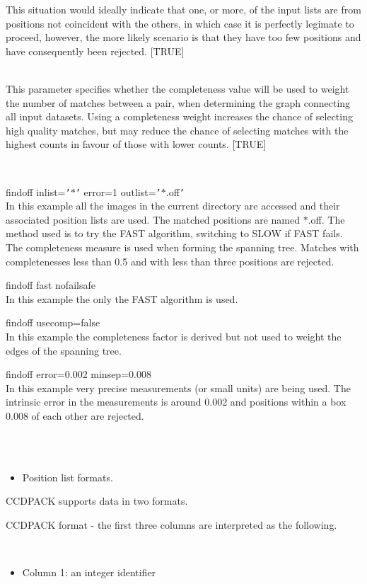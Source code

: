 \documentclass[twoside,11pt]{article}
\renewcommand{\_}{\texttt{\symbol{95}}}
\newcommand{\qs}[1]{{\tt '}#1{\tt '}}
\newcommand{\sstexamples}[1]{
   \item[Examples:] \mbox{} \\
   \vspace{-3.5ex}
   \begin{description}
      #1
   \end{description}
}
\newcommand{\sstsubsection}[1]{ \item[{#1}] \mbox{} \\}
\newcommand{\sstexamplesubsection}[2]{\sloppy \item{\ssttt #1} \mbox{} \\ #2 }
\newcommand{\sstnotes}[1]{\item[Notes:] \mbox{} \\[1.3ex] #1}
\newcommand{\sstitemlist}[1]{
  \mbox{} \\
  \vspace{-3.5ex}
  \begin{itemize}
     #1
  \end{itemize}
}
\newcommand{\sstitem}{\item}
\newcommand{\sstexamples}[1]{
      \item[Examples:] \\
      \begin{description}
         #1
      \end{description}
      \\
   }
\newcommand{\sstsubsection}[1]{\item[{#1}]}
\newcommand{\sstexamplesubsection}[2]{\item[{\ssttt #1}] #2}
\newcommand{\sstnotes}[1]{\item[Notes:] #1 }
\newcommand{\sstitemlist}[1]{
      \begin{itemize}
         #1
      \end{itemize}
      \\
   }
\newcommand{\sstitem}{\item}
\begin{document}
{{{        This situation would ideally indicate that one, or more, of the
        input lists are from positions not coincident with the others, in
        which case it is perfectly legimate to proceed, however, the more
        likely scenario is that they have too few positions and have
        consequently been rejected.
        [TRUE]
     }
      \sstsubsection{
         USECOMP = LOGICAL (Read)
      } {
         This parameter specifies whether the completeness value will
         be used to weight the number of matches between a pair, when
         determining the graph connecting all input datasets. Using
         a completeness weight increases the chance of selecting high
         quality matches, but may reduce the chance of selecting matches
         with the highest counts in favour of those with lower counts.
         [TRUE]
      }
   }
   \sstexamples{
      \sstexamplesubsection{
         findoff inlist=\qs{$*$} error=1 outlist=\qs{$*$.off}
      } {
         In this example all the images in the current directory are
         accessed and their associated position lists are used. The
         matched positions are named $*$.off. The method used is to try
         the FAST algorithm, switching to SLOW if FAST fails. The
         completeness measure is used when forming the spanning tree.
         Matches with completenesses less than 0.5 and with less than
         three positions are rejected.
      }
      \sstexamplesubsection{
         findoff fast nofailsafe
      } {
         In this example the only the FAST algorithm is used.
      }
      \sstexamplesubsection{
         findoff usecomp=false
      } {
         In this example the completeness factor is derived but not used
         to weight the edges of the spanning tree.
      }
      \sstexamplesubsection{
         findoff error=0.002 minsep=0.008
      } {
         In this example very precise measurements (or small units)
         are being used. The intrinsic error in the measurements is
         around 0.002 and positions within a box 0.008 of each other are
         rejected.
      }
   }
   \sstnotes{
      \sstitemlist{

         \sstitem
         Position list formats.

      }
        CCDPACK supports data in two formats.

        CCDPACK format - the first three columns are interpreted as the
        following.

      \sstitemlist{

         \sstitem
              Column 1: an integer identifier

}}}
\end{document}
